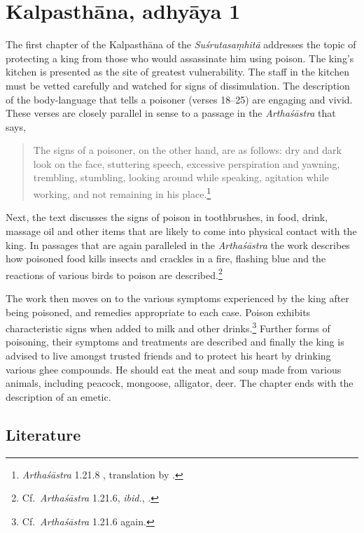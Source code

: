\section{Kalpasthāna, adhyāya 1}

The first chapter of the Kalpasthāna of the \emph{Suśrutasaṃhitā} addresses the 
topic of protecting a king from those who would assassinate him using poison.  
The king's kitchen is presented as the site of greatest vulnerability.  The staff in 
the kitchen must be vetted carefully and watched for signs of dissimulation.  The 
description of the body-language that tells a poisoner (verses 18--25) are 
engaging and vivid.  These verses are closely parallel in sense to a passage in the 
\emph{Arthaśāstra} that says, 
\begin{quote}
    The signs of a poisoner, on the other hand, are as follows: dry and
    dark look on the face, stuttering speech, excessive perspiration and yawning, 
    trembling, stumbling, looking around while speaking, agitation while
    working, and not remaining in his place.\footnote{\emph{Arthaśāstra} 1.21.8 
    \citep[1, 30]{kang-1969}, 
    translation by \citet[97]{oliv-2013}.} 
\end{quote}

Next, the text discusses the signs of poison in toothbrushes, in food, drink,
massage oil and other items that are likely to come into physical contact with the
king.  In passages that are again paralleled in the \emph{Arthaśāstra} the work
describes how poisoned food kills insects and crackles in a fire, flashing blue
and  the reactions of various birds to poison are described.\footnote{Cf.\
\emph{Arthaśāstra} 1.21.6, \emph{ibid.}, \citet[96]{oliv-2013}.}


The work then moves on to the various symptoms experienced by the king after 
being poisoned, and remedies appropriate to each case.  Poison exhibits 
characteristic signs when added to milk and other drinks.\footnote{Cf.\
\emph{Arthaśāstra} 1.21.6 again.} Further forms of poisoning, their symptoms 
and treatments are described  and finally the king is advised to live amongst 
trusted friends and to protect his heart by drinking various ghee compounds.  He 
should eat the meat and soup made from various animals, including peacock, 
mongoose, alligator, deer.  The chapter ends with the description of an emetic.

\subsection{Literature}

